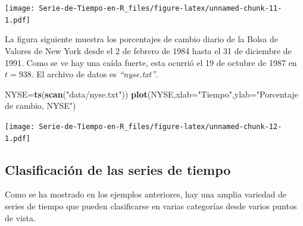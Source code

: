 \documentclass[12pt,]{krantz}
\makeatletter
\newenvironment{Shaded}{\begin{snugshade}}{\end{snugshade}}
\newcommand{\KeywordTok}[1]{\textcolor[rgb]{0.13,0.29,0.53}{\textbf{#1}}}
\newcommand{\DataTypeTok}[1]{\textcolor[rgb]{0.13,0.29,0.53}{#1}}
\newcommand{\StringTok}[1]{\textcolor[rgb]{0.31,0.60,0.02}{#1}}
\newcommand{\NormalTok}[1]{#1}
\newenvironment{kframe}{%
\medskip{}
\setlength{\fboxsep}{.8em}
 \def\at@end@of@kframe{}%
 \ifinner\ifhmode%
  \def\at@end@of@kframe{\end{minipage}}%
  \begin{minipage}{\columnwidth}%
 \fi\fi%
 \def\FrameCommand##1{\hskip\@totalleftmargin \hskip-\fboxsep
 \colorbox{shadecolor}{##1}\hskip-\fboxsep
     \hskip-\linewidth \hskip-\@totalleftmargin \hskip\columnwidth}%
 \MakeFramed {\advance\hsize-\width
   \@totalleftmargin\z@ \linewidth\hsize
   \@setminipage}}%
 {\par\unskip\endMakeFramed%
 \at@end@of@kframe}
\renewenvironment{Shaded}{\begin{kframe}}{\end{kframe}}
\theoremstyle{definition}
\theoremstyle{definition}
\theoremstyle{definition}
\theoremstyle{remark}
\let\BeginKnitrBlock\begin \let\EndKnitrBlock\end
\makeatother
\begin{document}
\texttt{[image: Serie-de-Tiempo-en-R\_files/figure-latex/unnamed-chunk-11-1.pdf]}

\BeginKnitrBlock{example}
\protect\hypertarget{exm:Bolsa-Valores-New-York}{}{\label{exm:Bolsa-Valores-New-York}
}La figura siguiente muestra los porcentajes de cambio diario de la
Bolsa de Valores de New York desde el 2 de febrero de 1984 hasta el 31
de diciembre de 1991. Como se ve hay una caída fuerte, esta ocurrió el
19 de octubre de 1987 en \(t=938\). El archivo de datos es
\emph{``nyse.txt''}.
\EndKnitrBlock{example}

\begin{Shaded}
\begin{Highlighting}[]
\NormalTok{NYSE=}\KeywordTok{ts}\NormalTok{(}\KeywordTok{scan}\NormalTok{(}\StringTok{"data/nyse.txt"}\NormalTok{))}
\KeywordTok{plot}\NormalTok{(NYSE,}\DataTypeTok{xlab=}\StringTok{"Tiempo"}\NormalTok{,}\DataTypeTok{ylab=}\StringTok{"Porcentaje de cambio, NYSE"}\NormalTok{)}
\end{Highlighting}
\end{Shaded}

\texttt{[image: Serie-de-Tiempo-en-R\_files/figure-latex/unnamed-chunk-12-1.pdf]}

\subsection{Clasificación de las series de
tiempo}\label{clasificacion-de-las-series-de-tiempo}

Como se ha mostrado en los ejemplos anteriores, hay una amplia variedad
de series de tiempo que pueden clasificarse en varias categorías desde
varios puntos de vista.
\end{document}
